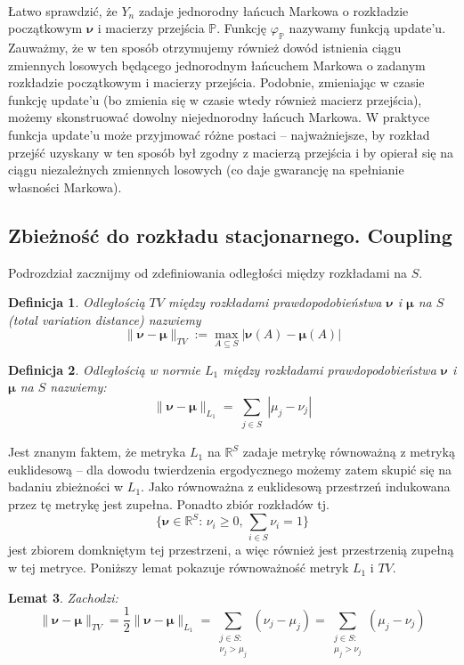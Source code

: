 \documentclass[a4paper]{article}
\theoremstyle{defn}
\newtheorem{defn}{Definicja}[subsection]
\theoremstyle{theorem}
\theoremstyle{lemma}
\newtheorem{lemma}[defn]{Lemat}
\theoremstyle{cor}
\theoremstyle{fact}
\begin{document}
\\
Łatwo sprawdzić, że $Y_n$ zadaje jednorodny łańcuch Markowa o rozkładzie początkowym $\boldsymbol{\nu}$ i macierzy przejścia $\mathbb{P}$. Funkcję $\varphi_{\mathbb{P}}$ nazywamy funkcją update'u. Zauważmy, że w ten sposób otrzymujemy również dowód istnienia ciągu zmiennych losowych będącego jednorodnym łańcuchem Markowa o zadanym rozkładzie początkowym i macierzy przejścia.
Podobnie, zmieniając w czasie funkcję update'u (bo zmienia się w czasie wtedy również macierz przejścia), możemy skonstruować dowolny niejednorodny łańcuch Markowa. W praktyce funkcja update'u może przyjmować różne postaci – najważniejsze, by rozkład przejść uzyskany w ten sposób był zgodny z macierzą przejścia i by opierał się na ciągu niezależnych zmiennych losowych (co daje gwarancję na spełnianie własności Markowa).
\subsection{Zbieżność do rozkładu stacjonarnego. Coupling}
\label{sect2.4}
Podrozdział zacznijmy od zdefiniowania odległości między rozkładami na $S$.
\begin{defn}\label{defn2.4.1}
Odległością $TV$ między rozkładami prawdopodobieństwa $\boldsymbol{\nu}$ i $\boldsymbol{\mu}$ na $S$ (\textit{total variation distance}) nazwiemy $$\|\boldsymbol{\nu} - \boldsymbol{\mu}\|_{TV} := \max\limits_{A \subseteq S} |\boldsymbol{\nu}(A) - \boldsymbol{\mu}(A)|$$
\end{defn}
\begin{defn}\label{defn2.4.2}
Odległością w normie $L_1$ między rozkładami prawdopodobieństwa $\boldsymbol{\nu}$ i $\boldsymbol{\mu}$ na $S$ nazwiemy:
$$\|\boldsymbol{\nu} - \boldsymbol{\mu}\|_{L_1} = \sum\limits_{\substack{j \in S}} |\mu_j - \nu_j|$$
\end{defn}
Jest znanym faktem, że metryka $L_1$ na $\mathbb{R}^S$ zadaje metrykę równoważną z metryką euklidesową – dla dowodu twierdzenia ergodycznego możemy zatem skupić się na badaniu zbieżności w $L_1$. Jako równoważna z euklidesową przestrzeń indukowana przez tę metrykę jest zupełna. Ponadto zbiór rozkładów tj.
$$\{\boldsymbol{\nu} \in \mathbb{R}^S:\, \nu_i \geq 0, \, \sum\limits_{i \in S} \nu_i = 1\}$$
jest zbiorem domkniętym tej przestrzeni, a więc również jest przestrzenią zupełną w tej metryce. Poniższy lemat pokazuje równoważność metryk $L_1$ i $TV$.
\begin{lemma}\label{lemma2.4.3}
Zachodzi:
$$\|\boldsymbol{\nu} - \boldsymbol{\mu}\|_{TV} = \frac{1}{2}\|\boldsymbol{\nu} - \boldsymbol{\mu}\|_{L_1} = \sum\limits_{\substack{j \in S:\\ \nu_j > \mu_j}} (\nu_j - \mu_j) = \sum\limits_{\substack{j \in S:\\ \mu_j > \nu_j}} (\mu_j - \nu_j)$$
\end{lemma}
\end{document}
